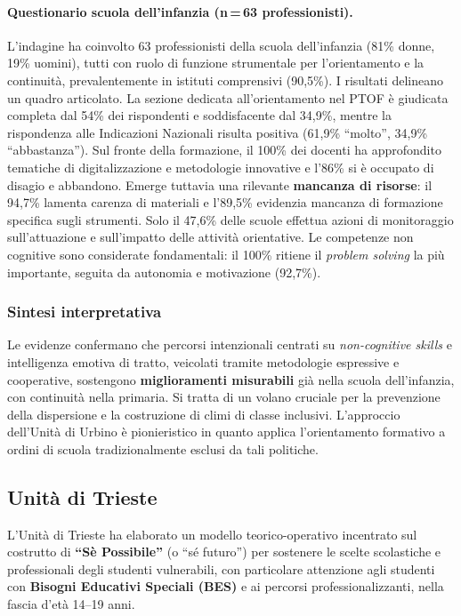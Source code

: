 \documentclass[12pt,a4paper]{article}
\begin{document}
\paragraph{Questionario scuola dell'infanzia (n\,=\,63 professionisti).} L'indagine ha coinvolto 63 professionisti della scuola dell'infanzia (81\% donne, 19\% uomini), tutti con ruolo di funzione strumentale per l'orientamento e la continuit\`a, prevalentemente in istituti comprensivi (90,5\%). I risultati delineano un quadro articolato. La sezione dedicata all'orientamento nel PTOF \`e giudicata completa dal 54\% dei rispondenti e soddisfacente dal 34,9\%, mentre la rispondenza alle Indicazioni Nazionali risulta positiva (61,9\% ``molto'', 34,9\% ``abbastanza''). Sul fronte della formazione, il 100\% dei docenti ha approfondito tematiche di digitalizzazione e metodologie innovative e l'86\% si \`e occupato di disagio e abbandono. Emerge tuttavia una rilevante \textbf{mancanza di risorse}: il 94,7\% lamenta carenza di materiali e l'89,5\% evidenzia mancanza di formazione specifica sugli strumenti. Solo il 47,6\% delle scuole effettua azioni di monitoraggio sull'attuazione e sull'impatto delle attivit\`a orientative. Le competenze non cognitive sono considerate fondamentali: il 100\% ritiene il \textit{problem solving} la pi\`u importante, seguita da autonomia e motivazione (92,7\%).

\subsubsection{Sintesi interpretativa}

Le evidenze confermano che percorsi intenzionali centrati su \textit{non-cognitive skills} e intelligenza emotiva di tratto, veicolati tramite metodologie espressive e cooperative, sostengono \textbf{miglioramenti misurabili} gi\`a nella scuola dell'infanzia, con continuit\`a nella primaria. Si tratta di un volano cruciale per la prevenzione della dispersione e la costruzione di climi di classe inclusivi. L'approccio dell'Unit\`a di Urbino \`e pionieristico in quanto applica l'orientamento formativo a ordini di scuola tradizionalmente esclusi da tali politiche.


\subsection{Unit\`a di Trieste}

L'Unit\`a di Trieste ha elaborato un modello teorico-operativo incentrato sul costrutto di \textbf{``S\`e Possibile''} (o ``s\'e futuro'') per sostenere le scelte scolastiche e professionali degli studenti vulnerabili, con particolare attenzione agli studenti con \textbf{Bisogni Educativi Speciali (BES)} e ai percorsi professionalizzanti, nella fascia d'et\`a 14--19 anni.
\end{document}
